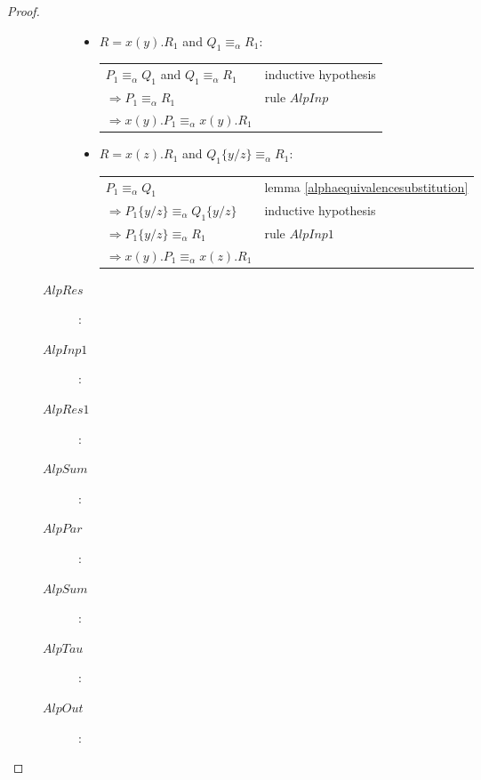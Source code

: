 \begin{lemma}
\begin{proof}
\begin{description}
\begin{description}
	    \begin{itemize}
	      \item 
		$R=x(y).R_{1}$ and $Q_{1}\equiv_{\alpha}R_{1}$:
		\begin{center}
		  \begin{tabular}{ll}
			$P_{1}\equiv_{\alpha}Q_{1}$ and $Q_{1}\equiv_{\alpha}R_{1}$
		      &
			inductive hypothesis
		    \\
			$\Rightarrow P_{1}\equiv_{\alpha}R_{1}$
		      &
			rule $AlpInp$
		    \\
			$\Rightarrow x(y).P_{1}\equiv_{\alpha}x(y).R_{1}$
		      &
		    \\
		  \end{tabular}
		\end{center}
	      \item 
		$R=x(z).R_{1}$ and $Q_{1}\{y/z\}\equiv_{\alpha}R_{1}$:
		\begin{center}
		  \begin{tabular}{ll}
			$P_{1}\equiv_{\alpha}Q_{1}$
		      &
			lemma \ref{alphaequivalencesubstitution}
		    \\
			$\Rightarrow P_{1}\{y/z\}\equiv_{\alpha}Q_{1}\{y/z\}$
		      &
			inductive hypothesis
		    \\
			$\Rightarrow P_{1}\{y/z\}\equiv_{\alpha}R_{1}$
		      &
			rule $AlpInp1$
		    \\
			$\Rightarrow x(y).P_{1}\equiv_{\alpha}x(z).R_{1}$
		      &
		    \\
		  \end{tabular}
		\end{center}		
		 
	    \end{itemize}
	  \item[$AlpRes$]:
	    
	  \item[$AlpInp1$]:
	    
	  \item[$AlpRes1$]:
	    
	  \item[$AlpSum$]:
	    
	  \item[$AlpPar$]:
	    
	  \item[$AlpSum$]:
	    
	  \item[$AlpTau$]:
	    
	  \item[$AlpOut$]:
	    
	\end{description}
    \end{description}
  \end{proof}
\end{lemma}





